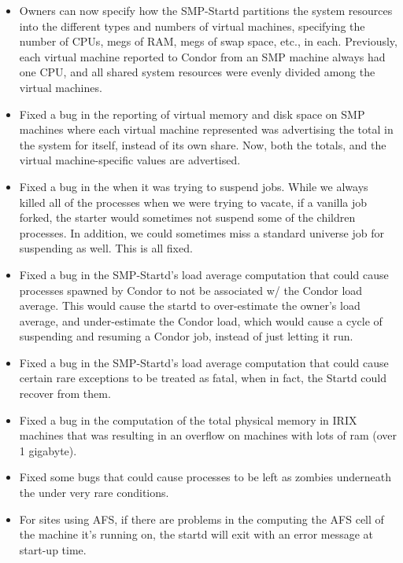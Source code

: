 \begin{itemize}

\item Owners can now specify how the SMP-Startd partitions the system
resources into the different types and numbers of virtual machines,
specifying the number of CPUs, megs of RAM, megs of swap space, etc.,
in each.
Previously, each virtual machine reported to Condor from an SMP
machine always had one CPU, and all shared system resources were
evenly divided among the virtual machines.

\item Fixed a bug in the reporting of virtual memory and disk space on
SMP machines where each virtual machine represented was advertising
the total in the system for itself, instead of its own share.
Now, both the totals, and the virtual machine-specific values are
advertised.  

\item Fixed a bug in the  when it was trying to
suspend jobs.
While we always killed all of the processes when we were trying to
vacate, if a vanilla job forked, the starter would sometimes not
suspend some of the children processes.
In addition, we could sometimes miss a standard universe job for
suspending as well.
This is all fixed.

\item Fixed a bug in the SMP-Startd's load average computation that
could cause processes spawned by Condor to not be associated w/ the
Condor load average.
This would cause the startd to over-estimate the owner's load average,
and under-estimate the Condor load, which would cause a cycle of
suspending and resuming a Condor job, instead of just letting it run.

\item Fixed a bug in the SMP-Startd's load average computation that
could cause certain rare exceptions to be treated as fatal, when in
fact, the Startd could recover from them.

\item Fixed a bug in the computation of the total physical memory in
IRIX machines that was resulting in an overflow on machines with
lots of ram (over 1 gigabyte).

\item Fixed some bugs that could cause  processes to
be left as zombies underneath the  under very rare
conditions.  

\item For sites using AFS, if there are problems in the
 computing the AFS cell of the machine it's running on,
the startd will exit with an error message at start-up time.


\end{itemize}
